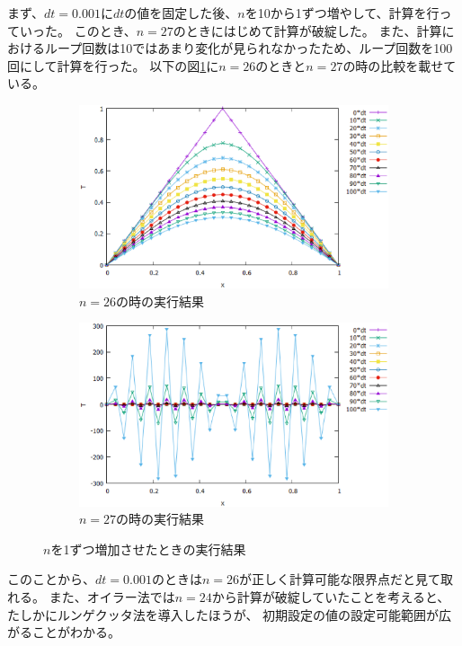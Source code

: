 \documentclass{jsarticle}
\begin{document}
まず、$dt=0.001$に$dt$の値を固定した後、$n$を10から1ずつ増やして、計算を行っていった。
このとき、$n=27$のときにはじめて計算が破綻した。
また、計算におけるループ回数は10ではあまり変化が見られなかったため、ループ回数を100回にして計算を行った。
以下の図\ref{fig04}に$n=26$のときと$n=27$の時の比較を載せている。
\begin{figure}[H]
	\centering
	\begin{subfigure}{0.9\columnwidth}
		\centering
		\includegraphics[width=\columnwidth]{pic06.eps}
		\caption{$n=26$の時の実行結果}
	\end{subfigure}
	\begin{subfigure}{0.9\columnwidth}
		\centering
		\includegraphics[width=\columnwidth]{pic07.eps}
		\caption{$n=27$の時の実行結果}
	\end{subfigure}
	\label{fig04}
	\caption{$n$を1ずつ増加させたときの実行結果}
\end{figure}
このことから、$dt=0.001$のときは$n=26$が正しく計算可能な限界点だと見て取れる。
また、オイラー法では$n=24$から計算が破綻していたことを考えると、たしかにルンゲクッタ法を導入したほうが、
初期設定の値の設定可能範囲が広がることがわかる。
\end{document}
